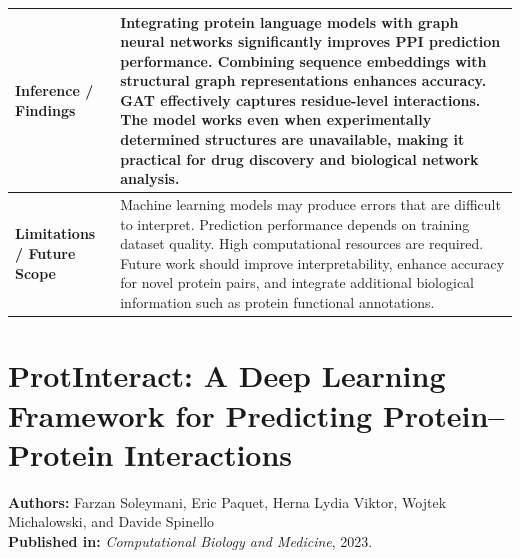 \documentclass[12pt,a4paper]{report}
\begin{document}
\begin{table}[H]
\centering
\renewcommand{\arraystretch}{1.5}
\begin{tabular}{|p{}|p{}|}
\hline
\textbf{Inference / Findings} & Integrating protein language models with graph neural networks significantly improves PPI prediction performance. Combining sequence embeddings with structural graph representations enhances accuracy. GAT effectively captures residue-level interactions. The model works even when experimentally determined structures are unavailable, making it practical for drug discovery and biological network analysis. \\ \hline
\textbf{Limitations / Future Scope} & Machine learning models may produce errors that are difficult to interpret. Prediction performance depends on training dataset quality. High computational resources are required. Future work should improve interpretability, enhance accuracy for novel protein pairs, and integrate additional biological information such as protein functional annotations. \\ \hline
\end{tabular}
\end{table}

\newpage

\section{ProtInteract: A Deep Learning Framework for Predicting Protein–Protein Interactions}
\textbf{Authors:} Farzan Soleymani, Eric Paquet, Herna Lydia Viktor, Wojtek Michalowski, and Davide Spinello \\
\textbf{Published in:} \textit{Computational Biology and Medicine}, 2023.
\end{document}
